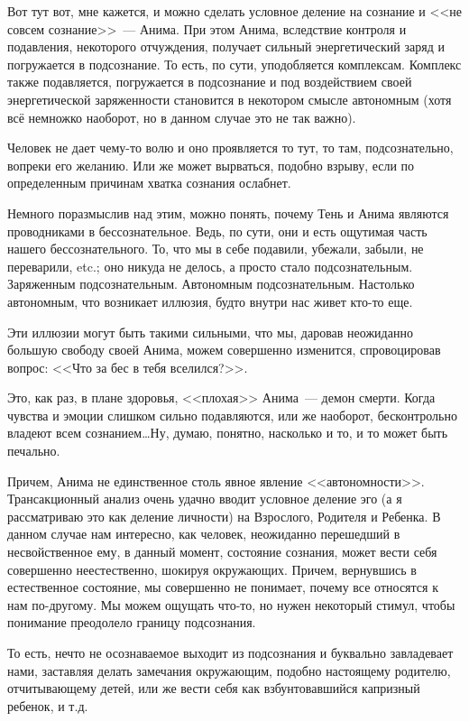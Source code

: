 \documentclass[a5paper,12pt,twoside]{memoir}
\begin{document}
Вот тут вот, мне кажется, и можно сделать условное деление на сознание и <<не совсем сознание>>~--- Анима. При этом Анима, вследствие контроля и подавления, некоторого отчуждения, получает сильный энергетический заряд и погружается в подсознание. То есть, по сути, уподобляется комплексам. Комплекс также подавляется, погружается в подсознание и под воздействием своей энергетической заряженности становится в некотором смысле автономным (хотя всё немножко наоборот, но в данном случае это не так важно).

Человек не дает чему-то волю и оно проявляется то тут, то там, подсознательно, вопреки его желанию. Или же может вырваться, подобно взрыву, если по определенным причинам хватка сознания ослабнет.

Немного поразмыслив над этим, можно понять, почему Тень и Анима являются проводниками в бессознательное. Ведь, по сути, они и есть ощутимая часть нашего бессознательного. То, что мы в себе подавили, убежали, забыли, не переварили, etc.; оно никуда не делось, а просто стало подсознательным. Заряженным подсознательным. Автономным подсознательным. Настолько автономным, что возникает иллюзия, будто внутри нас живет кто-то еще.

Эти иллюзии могут быть такими сильными, что мы, даровав неожиданно большую свободу своей Анима, можем совершенно изменится, спровоцировав вопрос: <<Что за бес в тебя вселился?>>.

Это, как раз, в плане здоровья, <<плохая>> Анима~--- демон смерти. Когда чувства и эмоции слишком сильно подавляются, или же наоборот, бесконтрольно владеют всем сознанием\ldots Ну, думаю, понятно, насколько и то, и то может быть печально.

Причем, Анима не единственное столь явное явление <<автономности>>. Трансакционный анализ очень удачно вводит условное деление эго (а я рассматриваю это как деление личности) на Взрослого, Родителя и Ребенка. В данном случае нам интересно, как человек, неожиданно перешедший в несвойственное ему, в данный момент, состояние сознания, может вести себя совершенно неестественно, шокируя окружающих. Причем, вернувшись в естественное состояние, мы совершенно не понимает, почему все относятся к нам по-другому. Мы можем ощущать что-то, но нужен некоторый стимул, чтобы понимание преодолело границу подсознания.

То есть, нечто не осознаваемое выходит из подсознания и буквально завладевает нами, заставляя делать замечания окружающим, подобно настоящему родителю, отчитывающему детей, или же вести себя как взбунтовавшийся капризный ребенок, и т.д.
\end{document}
